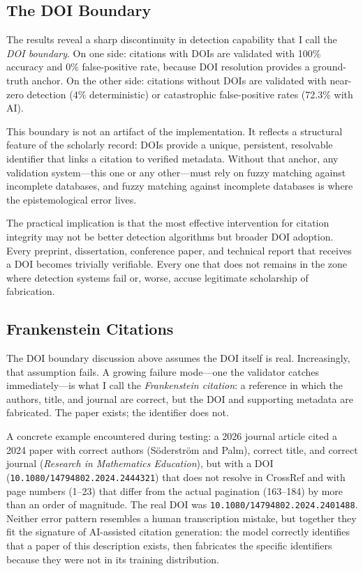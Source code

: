 \subsection{The DOI Boundary}

The results reveal a sharp discontinuity in detection capability that I call the \emph{DOI boundary}. On one side: citations with DOIs are validated with 100\% accuracy and 0\% false-positive rate, because DOI resolution provides a ground-truth anchor. On the other side: citations without DOIs are validated with near-zero detection (4\% deterministic) or catastrophic false-positive rates (72.3\% with AI).

This boundary is not an artifact of the implementation. It reflects a structural feature of the scholarly record: DOIs provide a unique, persistent, resolvable identifier that links a citation to verified metadata. Without that anchor, any validation system---this one or any other---must rely on fuzzy matching against incomplete databases, and fuzzy matching against incomplete databases is where the epistemological error lives.

The practical implication is that the most effective intervention for citation integrity may not be better detection algorithms but broader DOI adoption. Every preprint, dissertation, conference paper, and technical report that receives a DOI becomes trivially verifiable. Every one that does not remains in the zone where detection systems fail or, worse, accuse legitimate scholarship of fabrication.

\subsection{Frankenstein Citations}

The DOI boundary discussion above assumes the DOI itself is real. Increasingly, that assumption fails. A growing failure mode---one the validator catches immediately---is what I call the \emph{Frankenstein citation}: a reference in which the authors, title, and journal are correct, but the DOI and supporting metadata are fabricated. The paper exists; the identifier does not.

A concrete example encountered during testing: a 2026 journal article cited a 2024 paper with correct authors (S\"oderstr\"om and Palm), correct title, and correct journal (\emph{Research in Mathematics Education}), but with a DOI (\texttt{10.1080/14794802.2024.2444321}) that does not resolve in CrossRef and with page numbers (1--23) that differ from the actual pagination (163--184) by more than an order of magnitude. The real DOI was \texttt{10.1080/14794802.2024.2401488}. Neither error pattern resembles a human transcription mistake, but together they fit the signature of AI-assisted citation generation: the model correctly identifies that a paper of this description exists, then fabricates the specific identifiers because they were not in its training distribution.

